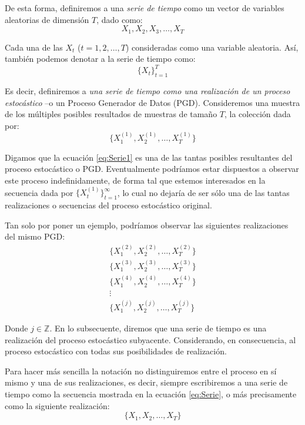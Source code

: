 \documentclass[
]{book}
\begin{document}
De esta forma, definiremos a una \emph{serie de tiempo} como un vector de variables aleatorias de dimensión \(T\), dado como:
\begin{equation}
    X_1, X_2, X_3, \ldots ,X_T
    \label{eq:Serie0}
\end{equation}

Cada una de las \(X_t\) (\(t = 1, 2, \ldots, T\)) consideradas como una variable aleatoria. Así, también podemos denotar a la serie de tiempo como:
\begin{equation}
    \{ X_t \}^T_{t = 1}
    \label{eq:Serie}
\end{equation}

Es decir, definiremos a \emph{una serie de tiempo como una realización de un proceso estocástico} --o un Proceso Generador de Datos (PGD). Consideremos una muestra de los múltiples posibles resultados de muestras de tamaño \(T\), la colección dada por:
\begin{equation}
    \{X^{(1)}_1, X^{(1)}_2, \ldots, X^{(1)}_T\}
    \label{eq:Serie1}
\end{equation}

Digamos que la ecuación \eqref{eq:Serie1} es una de las tantas posibles resultantes del proceso estocástico o PGD. Eventualmente podríamos estar dispuestos a observar este proceso indefinidamente, de forma tal que estemos interesados en la secuencia dada por \(\{ X^{(1)}_t \}^{\infty}_{t = 1}\), lo cual no dejaría de ser sólo una de las tantas realizaciones o secuencias del proceso estocástico original.

Tan solo por poner un ejemplo, podríamos observar las siguientes realizaciones del mismo PGD:
\begin{eqnarray*}
    & \{X^{(2)}_1, X^{(2)}_2, \ldots, X^{(2)}_T\} & \\
    & \{X^{(3)}_1, X^{(3)}_2, \ldots, X^{(3)}_T\} & \\
    & \{X^{(4)}_1, X^{(4)}_2, \ldots, X^{(4)}_T\} & \\
    & \vdots & \\
    & \{X^{(j)}_1, X^{(j)}_2, \ldots, X^{(j)}_T\} & 
\end{eqnarray*}

Donde \(j \in \mathbb{Z}\). En lo subsecuente, diremos que una serie de tiempo es una realización del proceso estocástico subyacente. Considerando, en consecuencia, al proceso estocástico con todas sus posibilidades de realización.

Para hacer más sencilla la notación no distinguiremos entre el proceso en sí mismo y una de sus realizaciones, es decir, siempre escribiremos a una serie de tiempo como la secuencia mostrada en la ecuación \eqref{eq:Serie}, o más precisamente como la siguiente realización:
\begin{equation}
    \{ X_1, X_2, \ldots, X_T \}
    \label{eq:Serie2}
\end{equation}
\end{document}
